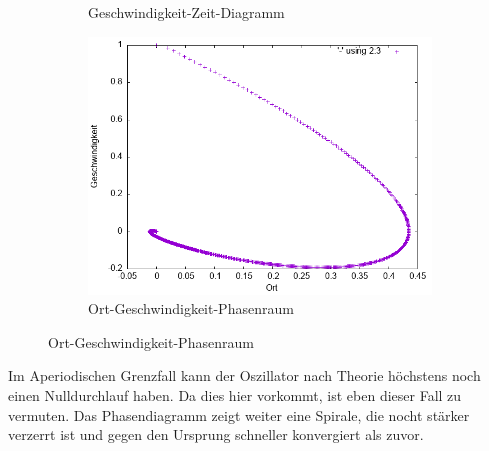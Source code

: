 \documentclass[
    oneside,
    ngerman,
    footinclude=false,
    captions=tableheading,
    DIV=12
]{scrartcl}
\begin{document}
\begin{figure}[H]
\begin{subfigure}[b]{0.45\textwidth}
                        \caption{Geschwindigkeit-Zeit-Diagramm}
                        \label{fig:VVA1(a)-001-1.5-v}
                    \end{subfigure}
                    \begin{subfigure}[b]{0.45\textwidth}
                        \centering
                        \includegraphics[width=\textwidth]{Bilddateien/VVA1(b)-001-1.5-xv.png}
                        \caption{Ort-Geschwindigkeit-Phasenraum}
                        \label{fig:VVA1(a)-001-1.5-xv}
                    \end{subfigure}
                \end{figure}
                Im Aperiodischen Grenzfall kann der Oszillator nach Theorie höchstens noch einen Nulldurchlauf haben. Da dies hier vorkommt, ist eben dieser Fall zu vermuten. Das Phasendiagramm zeigt weiter eine Spirale, die nocht stärker verzerrt ist und gegen den Ursprung schneller konvergiert als zuvor.
\end{document}
